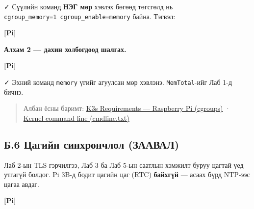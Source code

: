 ✓ Сүүлийн команд \textbf{НЭГ мөр} хэвлэх бөгөөд төгсгөлд нь \texttt{cgroup\_\allowbreak{}memory=\allowbreak{}1\ cgroup\_\allowbreak{}enable=\allowbreak{}memory} байна. Тэгвэл:

\textbf{{[}Pi{]}}

\begin{Shaded}
\begin{Highlighting}[]
\end{Highlighting}
\end{Shaded}

\textbf{Алхам 2 --- дахин холбогдоод шалгах.}

\textbf{{[}Pi{]}}

\begin{Shaded}
\begin{Highlighting}[]
\KeywordTok{|} 
\end{Highlighting}
\end{Shaded}

✓ Эхний команд \texttt{memory} үгийг агуулсан мөр хэвлэнэ. \texttt{MemTotal}-ийг Лаб 1-д бичнэ.

\begin{quote}
Албан ёсны баримт: \href{https://docs.k3s.io/installation/requirements}{K3s Requirements --- Raspberry Pi (cgroups)} · \href{https://www.raspberrypi.com/documentation/computers/configuration.html\#configure-the-kernel-command-line}{Kernel command line (cmdline.\allowbreak{}txt)}
\end{quote}

\hypertarget{ux431.6-ux446ux430ux433ux438ux439ux43d-ux441ux438ux43dux445ux440ux43eux43dux447ux43bux43eux43b-ux437ux430ux430ux432ux430ux43b}{%
\subsection{Б.6 Цагийн синхрончлол (ЗААВАЛ)}\label{ux431.6-ux446ux430ux433ux438ux439ux43d-ux441ux438ux43dux445ux440ux43eux43dux447ux43bux43eux43b-ux437ux430ux430ux432ux430ux43b}}

Лаб 2-ын TLS гэрчилгээ, Лаб 3 ба Лаб 5-ын саатлын хэмжилт буруу цагтай үед утгагүй болдог. Pi 3B-д бодит цагийн цаг (RTC) \textbf{байхгүй} --- асаах бүрд NTP-ээс цагаа авдаг.

\textbf{{[}Pi{]}}

\begin{Shaded}
\begin{Highlighting}[]
\end{Highlighting}
\end{Shaded}

